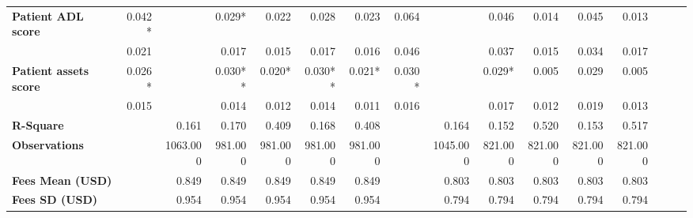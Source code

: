 \begin{tabular}{@{\extracolsep{5pt}}lrrrrrrrrrrrrrrr}
{\bf Patient ADL score} & 0.042*\phantom{**} & \phantom{***} & 0.029*\phantom{**} & 0.022\phantom{***} & 0.028\phantom{***} & 0.023\phantom{***} & 0.064\phantom{***} & \phantom{***} & 0.046\phantom{***} & 0.014\phantom{***} & 0.045\phantom{***} & 0.013\phantom{***} \\
{\bf } & 0.021\phantom{***} & \phantom{***} & 0.017\phantom{***} & 0.015\phantom{***} & 0.017\phantom{***} & 0.016\phantom{***} & 0.046\phantom{***} & \phantom{***} & 0.037\phantom{***} & 0.015\phantom{***} & 0.034\phantom{***} & 0.017\phantom{***} \\
{\bf Patient assets score} & 0.026*\phantom{**} & \phantom{***} & 0.030**\phantom{*} & 0.020*\phantom{**} & 0.030**\phantom{*} & 0.021*\phantom{**} & 0.030*\phantom{**} & \phantom{***} & 0.029*\phantom{**} & 0.005\phantom{***} & 0.029\phantom{***} & 0.005\phantom{***} \\
{\bf } & 0.015\phantom{***} & \phantom{***} & 0.014\phantom{***} & 0.012\phantom{***} & 0.014\phantom{***} & 0.011\phantom{***} & 0.016\phantom{***} & \phantom{***} & 0.017\phantom{***} & 0.012\phantom{***} & 0.019\phantom{***} & 0.013\phantom{***} \\
{\bf R-Square} & \phantom{***} & 0.161\phantom{***} & 0.170\phantom{***} & 0.409\phantom{***} & 0.168\phantom{***} & 0.408\phantom{***} & \phantom{***} & 0.164\phantom{***} & 0.152\phantom{***} & 0.520\phantom{***} & 0.153\phantom{***} & 0.517\phantom{***} \\
{\bf Observations} & \phantom{***} & 1063.000\phantom{***} & 981.000\phantom{***} & 981.000\phantom{***} & 981.000\phantom{***} & 981.000\phantom{***} & \phantom{***} & 1045.000\phantom{***} & 821.000\phantom{***} & 821.000\phantom{***} & 821.000\phantom{***} & 821.000\phantom{***} \\
{\bf Fees Mean (USD)} & \phantom{***} & 0.849\phantom{***} & 0.849\phantom{***} & 0.849\phantom{***} & 0.849\phantom{***} & 0.849\phantom{***} & \phantom{***} & 0.803\phantom{***} & 0.803\phantom{***} & 0.803\phantom{***} & 0.803\phantom{***} & 0.803\phantom{***} \\
{\bf Fees SD (USD)} & \phantom{***} & 0.954\phantom{***} & 0.954\phantom{***} & 0.954\phantom{***} & 0.954\phantom{***} & 0.954\phantom{***} & \phantom{***} & 0.794\phantom{***} & 0.794\phantom{***} & 0.794\phantom{***} & 0.794\phantom{***} & 0.794\phantom{***} \\
\hline
\end{tabular}
